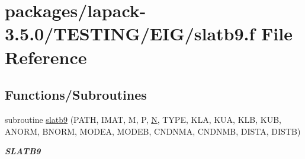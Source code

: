 \hypertarget{slatb9_8f}{}\section{packages/lapack-\/3.5.0/\+T\+E\+S\+T\+I\+N\+G/\+E\+I\+G/slatb9.f File Reference}
\label{slatb9_8f}
\subsection*{Functions/\+Subroutines}
\begin{DoxyCompactItemize}
\item 
subroutine \hyperlink{group__single__eig_ga9540564c76aed17bc8b26a879ee5ca46}{slatb9} (P\+A\+T\+H, I\+M\+A\+T, M, P, \hyperlink{polmisc_8c_a0240ac851181b84ac374872dc5434ee4}{N}, T\+Y\+P\+E, K\+L\+A, K\+U\+A, K\+L\+B, K\+U\+B, A\+N\+O\+R\+M, B\+N\+O\+R\+M, M\+O\+D\+E\+A, M\+O\+D\+E\+B, C\+N\+D\+N\+M\+A, C\+N\+D\+N\+M\+B, D\+I\+S\+T\+A, D\+I\+S\+T\+B)
\begin{DoxyCompactList}\small\item\em {\bfseries S\+L\+A\+T\+B9} \end{DoxyCompactList}\end{DoxyCompactItemize}
